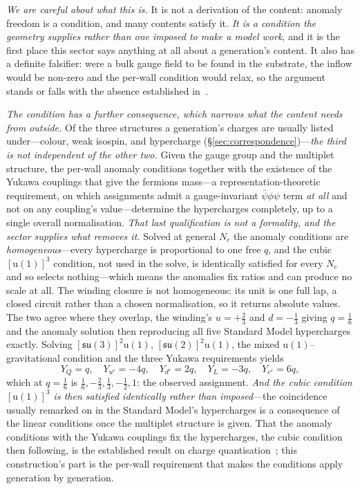\documentclass[11pt]{article}
\newcommand{\su}{\mathfrak{su}}
\begin{document}
\emph{We are careful about what this is.} It is not a derivation of the content: anomaly freedom is a
condition, and many contents satisfy it. \emph{It is a condition the geometry supplies rather than one imposed
to make a model work}, and it is the first place this sector says anything at all about a generation's content.
It also has a definite falsifier: were a bulk gauge field to be found in the substrate, the inflow would be
non-zero and the per-wall condition would relax, so the argument stands or falls with the absence established
in~\cite{JanzenBoundary}.

\emph{The condition has a further consequence, which narrows what the content needs from
outside.} Of the three structures a generation's charges are usually listed under---colour, weak isospin, and
hypercharge (\S\ref{sec:correspondence})---\emph{the third is not independent of the other two.} Given the gauge group and the
multiplet structure, the per-wall anomaly conditions together with the existence of the Yukawa couplings that
give the fermions mass---a representation-theoretic requirement, on which assignments admit a gauge-invariant
$\bar\psi\phi\psi$ term \emph{at all} and not on any coupling's value---determine the hypercharges completely,
up to a single overall normalisation. \emph{That last qualification is not a formality, and the sector supplies what removes it.} Solved at general $N_{c}$ the anomaly conditions are \emph{homogeneous}---every hypercharge is proportional to one free $q$, and the cubic $[\mathrm{u}(1)]^{3}$ condition, not used in the solve, is identically satisfied for every $N_{c}$ and so selects nothing---which means the anomalies fix ratios and can produce no scale at all. The winding closure is not homogeneous: its unit is one full lap, a closed circuit rather than a chosen normalisation, so it returns absolute values. The two agree where they overlap, the winding's $u=+\tfrac23$ and $d=-\tfrac13$ giving $q=\tfrac16$ and the anomaly solution then reproducing all five Standard Model hypercharges exactly. Solving
$[\su(3)]^{2}\mathrm{u}(1)$, $[\su(2)]^{2}\mathrm{u}(1)$, the mixed $\mathrm{u}(1)$--gravitational condition and
the three Yukawa requirements yields
\[
Y_{Q}=q,\quad Y_{u^{c}}=-4q,\quad Y_{d^{c}}=2q,\quad Y_{L}=-3q,\quad Y_{e^{c}}=6q,
\]
which at $q=\tfrac16$ is $\tfrac16,-\tfrac23,\tfrac13,-\tfrac12,1$: the observed
assignment. \emph{And the cubic condition $[\mathrm{u}(1)]^{3}$ is then
satisfied identically rather than imposed}---the coincidence usually remarked on in the Standard Model's
hypercharges is a consequence of the linear conditions once the multiplet structure is given. That the anomaly conditions with the Yukawa couplings fix the hypercharges, the cubic condition then following, is the established result on charge quantisation~\cite{GengMarshak1989,BabuMohapatra1989}; this construction's part is the per-wall requirement that makes the conditions apply generation by generation.
\end{document}
